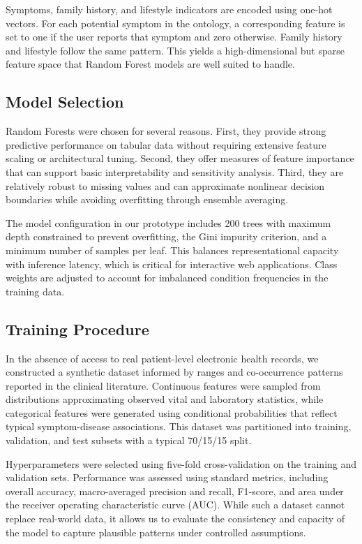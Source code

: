 \documentclass[conference]{IEEEtran}
\begin{document}
Symptoms, family history, and lifestyle indicators are encoded using one-hot vectors. For each potential symptom in the ontology, a corresponding feature is set to one if the user reports that symptom and zero otherwise. Family history and lifestyle follow the same pattern. This yields a high-dimensional but sparse feature space that Random Forest models are well suited to handle.

\subsection{Model Selection}

Random Forests were chosen for several reasons. First, they provide strong predictive performance on tabular data without requiring extensive feature scaling or architectural tuning. Second, they offer measures of feature importance that can support basic interpretability and sensitivity analysis. Third, they are relatively robust to missing values and can approximate nonlinear decision boundaries while avoiding overfitting through ensemble averaging.

The model configuration in our prototype includes 200 trees with maximum depth constrained to prevent overfitting, the Gini impurity criterion, and a minimum number of samples per leaf. This balances representational capacity with inference latency, which is critical for interactive web applications. Class weights are adjusted to account for imbalanced condition frequencies in the training data.

\subsection{Training Procedure}

In the absence of access to real patient-level electronic health records, we constructed a synthetic dataset informed by ranges and co-occurrence patterns reported in the clinical literature. Continuous features were sampled from distributions approximating observed vital and laboratory statistics, while categorical features were generated using conditional probabilities that reflect typical symptom-disease associations. This dataset was partitioned into training, validation, and test subsets with a typical 70/15/15 split.

Hyperparameters were selected using five-fold cross-validation on the training and validation sets. Performance was assessed using standard metrics, including overall accuracy, macro-averaged precision and recall, F1-score, and area under the receiver operating characteristic curve (AUC). While such a dataset cannot replace real-world data, it allows us to evaluate the consistency and capacity of the model to capture plausible patterns under controlled assumptions.
\end{document}
